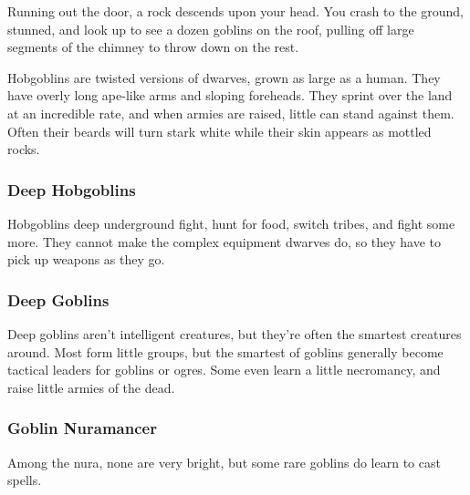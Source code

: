 \begin{multicols}{2}
\begin{boxtext}

	Running out the door, a rock descends upon your head.
	You crash to the ground, stunned, and look up to see a dozen goblins on the roof, pulling off large segments of the chimney to throw down on the rest.

\end{boxtext}

\label{hobgoblin}

Hobgoblins are twisted versions of dwarves, grown as large as a human.
They have overly long ape-like arms and sloping foreheads.
They sprint over the land at an incredible rate, and when armies are raised, little can stand against them.
Often their beards will turn stark white while their skin appears as mottled rocks.
 

\subsubsection{Deep Hobgoblins}\label{deep_hobgoblin}

Hobgoblins deep underground fight, hunt for food, switch tribes, and fight some more.  They cannot make the complex equipment dwarves do, so they have to pick up weapons as they go.



\subsubsection{Deep Goblins}\label{deep_goblin}

Deep goblins aren't intelligent creatures, but they're often the smartest creatures around.
Most form little groups, but the smartest of goblins generally become tactical leaders for goblins or ogres.
Some even learn a little necromancy, and raise little armies of the dead.



\subsubsection{Goblin Nuramancer}
Among the nura, none are very bright, but some rare goblins do learn to cast spells.


\end{multicols}
